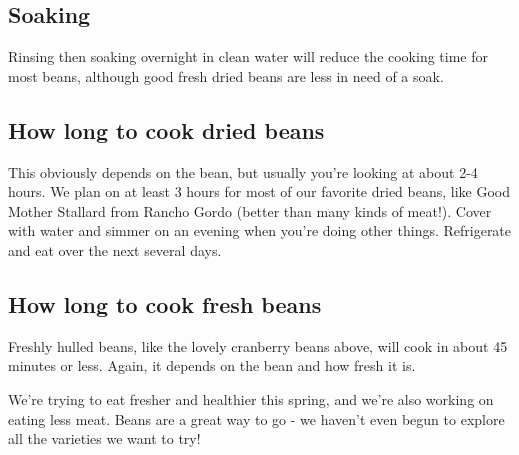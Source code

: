 \subsection{Soaking}
Rinsing then soaking overnight in clean water will reduce the cooking time for most beans, although good fresh dried beans are less in need of a soak.

\subsection{How long to cook dried beans}
This obviously depends on the bean, but usually you're looking at about 2-4 hours.
We plan on at least 3 hours for most of our favorite dried beans, like Good Mother Stallard from Rancho Gordo (better than many kinds of meat!).
Cover with water and simmer on an evening when you're doing other things.
Refrigerate and eat over the next several days.

\subsection{How long to cook fresh beans}
Freshly hulled beans, like the lovely cranberry beans above, will cook in about 45 minutes or less.
Again, it depends on the bean and how fresh it is.

We're trying to eat fresher and healthier this spring, and we're also working on eating less meat.
Beans are a great way to go - we haven't even begun to explore all the varieties we want to try!
